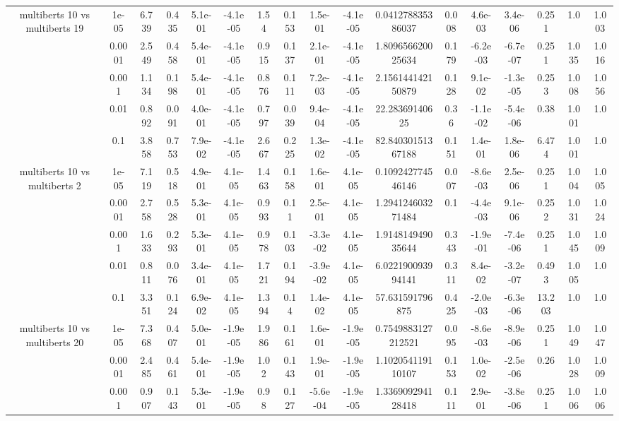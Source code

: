 \begin{tabular}{|c|c|c|c|c|c|c|c|c|c|c|c|c|c|c|c|c|}
\hline
\multirow{5}{*}{multiberts 10 vs multiberts 19} & 1e-05 & 6.739 & 0.435 & 5.1e-01 & -4.1e-05 & 1.54 & 0.153 & 1.5e-01 & -4.1e-05 & 0.041278835386037 & 0.008 & 4.6e-03 & 3.4e-06 & 0.251 & 1.0 & 1.003 \\
 & 0.0001 & 2.549 & 0.458 & 5.4e-01 & -4.1e-05 & 0.915 & 0.137 & 2.1e-01 & -4.1e-05 & 1.809656620025634 & 0.179 & -6.2e-03 & -6.7e-07 & 0.251 & 1.035 & 1.016 \\
 & 0.001 & 1.134 & 0.198 & 5.4e-01 & -4.1e-05 & 0.876 & 0.111 & 7.2e-03 & -4.1e-05 & 2.156144142150879 & 0.128 & 9.1e-02 & -1.3e-05 & 0.253 & 1.008 & 1.056 \\
 & 0.01 & 0.892 & 0.091 & 4.0e-01 & -4.1e-05 & 0.797 & 0.039 & 9.4e-04 & -4.1e-05 & 22.28369140625 & 0.36 & -1.1e-02 & -5.4e-06 & 0.38 & 1.001 & 1.0 \\
 & 0.1 & 3.858 & 0.753 & 7.9e-02 & -4.1e-05 & 2.667 & 0.225 & 1.3e-02 & -4.1e-05 & 82.84030151367188 & 0.151 & 1.4e-01 & 1.8e-06 & 6.474 & 1.001 & 1.0 \\
\hline
\multirow{5}{*}{multiberts 10 vs multiberts 2} & 1e-05 & 7.119 & 0.518 & 4.9e-01 & 4.1e-05 & 1.463 & 0.158 & 1.6e-01 & 4.1e-05 & 0.109242774546146 & 0.007 & -8.6e-03 & 2.5e-06 & 0.251 & 1.004 & 1.005 \\
 & 0.0001 & 2.758 & 0.528 & 5.3e-01 & 4.1e-05 & 0.993 & 0.11 & 2.5e-01 & 4.1e-05 & 1.294124603271484 & 0.1 & -4.4e-03 & 9.1e-06 & 0.252 & 1.031 & 1.024 \\
 & 0.001 & 1.633 & 0.293 & 5.3e-01 & 4.1e-05 & 0.978 & 0.103 & -3.3e-02 & 4.1e-05 & 1.914814949035644 & 0.343 & -1.9e-01 & -7.4e-06 & 0.251 & 1.045 & 1.009 \\
 & 0.01 & 0.811 & 0.076 & 3.4e-01 & 4.1e-05 & 1.721 & 0.194 & -3.9e-02 & 4.1e-05 & 6.022190093994141 & 0.311 & 8.4e-02 & -3.2e-07 & 0.493 & 1.005 & 1.0 \\
 & 0.1 & 3.351 & 0.124 & 6.9e-02 & 4.1e-05 & 1.394 & 0.14 & 1.4e-02 & 4.1e-05 & 57.631591796875 & 0.425 & -2.0e-03 & -6.3e-06 & 13.203 & 1.0 & 1.0 \\
\hline
\multirow{5}{*}{multiberts 10 vs multiberts 20} & 1e-05 & 7.368 & 0.407 & 5.0e-01 & -1.9e-05 & 1.986 & 0.161 & 1.6e-01 & -1.9e-05 & 0.7549883127212521 & 0.095 & -8.6e-03 & -8.9e-06 & 0.251 & 1.049 & 1.047 \\
 & 0.0001 & 2.485 & 0.461 & 5.4e-01 & -1.9e-05 & 1.02 & 0.143 & 1.9e-01 & -1.9e-05 & 1.102054119110107 & 0.153 & 1.0e-02 & -2.5e-06 & 0.26 & 1.028 & 1.009 \\
 & 0.001 & 0.907 & 0.143 & 5.3e-01 & -1.9e-05 & 0.98 & 0.127 & -5.6e-04 & -1.9e-05 & 1.336909294128418 & 0.111 & 2.9e-01 & -3.8e-06 & 0.251 & 1.006 & 1.006 \\

\end{tabular}
